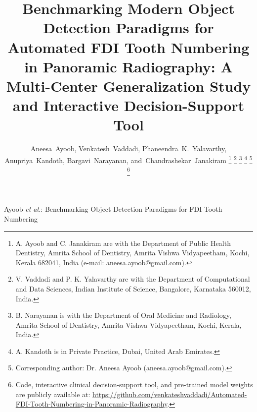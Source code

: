 \documentclass[10pt,journal,compsoc]{IEEEtran}
\begin{document}
\title{Benchmarking Modern Object Detection Paradigms for Automated FDI Tooth Numbering in Panoramic Radiography: A Multi-Center Generalization Study and Interactive Decision-Support Tool}

\author{Aneesa~Ayoob,
        Venkatesh~Vaddadi,
        Phaneendra~K.~Yalavarthy,
        Anupriya~Kandoth,
        Bargavi~Narayanan,
        and~Chandrashekar~Janakiram%
\thanks{A. Ayoob and C. Janakiram are with the Department of Public Health Dentistry, Amrita School of Dentistry, Amrita Vishwa Vidyapeetham, Kochi, Kerala 682041, India (e-mail: aneesa.ayoob@gmail.com).}%
\thanks{V. Vaddadi and P. K. Yalavarthy are with the Department of Computational and Data Sciences, Indian Institute of Science, Bangalore, Karnataka 560012, India.}%
\thanks{B. Narayanan is with the Department of Oral Medicine and Radiology, Amrita School of Dentistry, Amrita Vishwa Vidyapeetham, Kochi, Kerala, India.}%
\thanks{A. Kandoth is in Private Practice, Dubai, United Arab Emirates.}%
\thanks{Corresponding author: Dr. Aneesa Ayoob (aneesa.ayoob@gmail.com).}%
\thanks{Code, interactive clinical decision-support tool, and pre-trained model weights are publicly available at: \url{https://github.com/venkateshvaddadi/Automated-FDI-Tooth-Numbering-in-Panoramic-Radiography}.}%
}

%
{Ayoob \MakeLowercase{\textit{et al.}}: Benchmarking Object Detection Paradigms for FDI Tooth Numbering}
\end{document}

